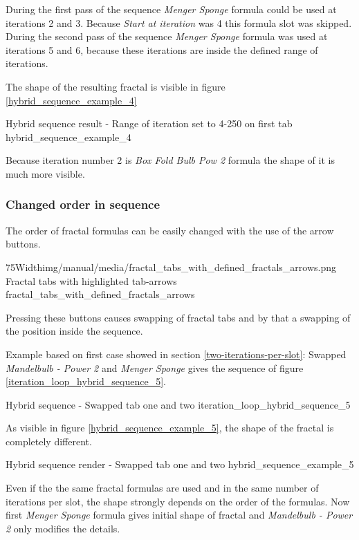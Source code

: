 During the first pass of the sequence \emph{Menger Sponge} formula could be used at iterations 2 and 3.
Because \emph{Start at iteration} was 4 this formula slot was skipped.
During the second pass of the sequence \emph{Menger Sponge} formula was used at iterations 5 and 6,
because these iterations are inside the defined range of iterations.

The shape of the resulting fractal is visible in figure \ref{hybrid_sequence_example_4}

{Hybrid sequence result - Range of iteration set to 4-250 on first tab}
{hybrid_sequence_example_4}

Because iteration number 2 is \emph{Box Fold Bulb Pow 2} formula the shape of it is much more visible.

\subsubsection{Changed order in sequence}

The order of fractal formulas can be easily changed with the use of the arrow buttons.

\simpleImageWithCaption75Width{img/manual/media/fractal_tabs_with_defined_fractals_arrows.png}
{Fractal tabs with highlighted tab-arrows}
{fractal_tabs_with_defined_fractals_arrows}

Pressing these buttons causes swapping of fractal tabs and by that a swapping of the position inside the sequence.

Example based on first case showed in section \ref{two-iterations-per-slot}:
Swapped \emph{Mandelbulb - Power 2} and \emph{Menger Sponge} gives the sequence of figure \ref{iteration_loop_hybrid_sequence_5}.

{Hybrid sequence - Swapped tab one and two}
{iteration_loop_hybrid_sequence_5}

As visible in figure \ref{hybrid_sequence_example_5}, the shape of the fractal is completely different.

{Hybrid sequence render - Swapped tab one and two}
{hybrid_sequence_example_5}

Even if the the same fractal formulas are used and in the same number of iterations per slot, the shape strongly depends on the order of the formulas.
Now first \emph{Menger Sponge} formula gives initial shape of fractal and \emph{Mandelbulb - Power 2} only modifies the details.
